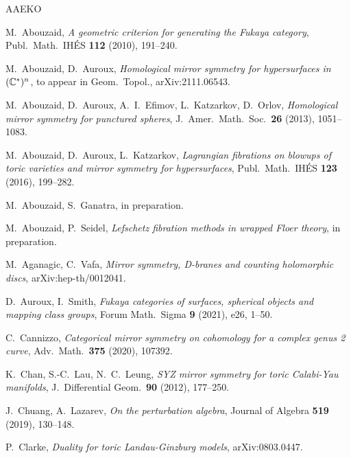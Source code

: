 \begin{thebibliography}{AAEKO}

   M.~Abouzaid, {\sl A geometric criterion for generating the Fukaya category},
   Publ.\ Math.\ IH\'ES {\bf 112} (2010), 191--240.

   M.~Abouzaid, D.~Auroux,
   {\sl Homological mirror symmetry for hypersurfaces in $(\mathbb{C}^*)^n$},
   to appear in Geom.\ Topol., arXiv:2111.06543.

   M.~Abouzaid, D.~Auroux, A.~I.~Efimov, L.~Katzarkov, D.~Orlov,
   {\sl Homological mirror symmetry for punctured spheres},
   J.\ Amer.\ Math.\ Soc.\ {\bf 26} (2013), 1051--1083.

   M.\ Abouzaid, D.\ Auroux, L.\ Katzarkov,
   {\sl Lagrangian fibrations on blowups of toric varieties and mirror symmetry
   for hypersurfaces},
   Publ.\ Math.\ IH\'ES {\bf 123} (2016), 199--282.

   M.~Abouzaid, S.~Ganatra, in preparation.

   M.~Abouzaid, P.~Seidel,
   {\sl Lefschetz fibration methods in wrapped Floer theory}, in preparation.

   M.\ Aganagic, C.\ Vafa,
   {\sl Mirror symmetry, D-branes and counting holomorphic discs},
   arXiv:hep-th/0012041.

   D.~Auroux, I.~Smith,
   {\sl Fukaya categories of surfaces, spherical objects and mapping class groups},
   Forum Math.\ Sigma {\bf 9} (2021), e26, 1--50.

   C.~Cannizzo,
   {\sl Categorical mirror symmetry on cohomology for a complex genus 2 curve},
   Adv.\ Math.\ {\bf 375} (2020), 107392.

   K.\ Chan, S.-C.\ Lau, N.\ C.\ Leung,
   {\sl SYZ mirror symmetry for toric Calabi-Yau manifolds},
   J.\ Differential Geom.\ {\bf 90} (2012), 177--250.

   J.~Chuang, A.~Lazarev,
   {\sl On the perturbation algebra},
   Journal of Algebra {\bf 519} (2019), 130--148.

   P.\ Clarke,
   {\sl Duality for toric Landau-Ginzburg models},
   arXiv:0803.0447.


\end{thebibliography}
